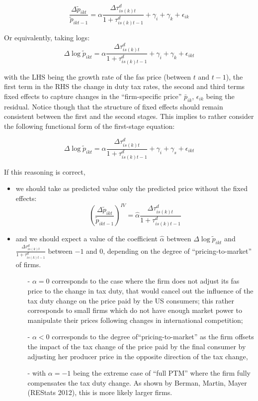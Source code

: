 \documentclass[a4paper,12pt]{article}
\begin{document}
$$\frac{\Delta \widetilde{p}_{ikt}}{\widetilde{p}_{ikt-1}} = \alpha \frac{\Delta \tau^d_{is(k)t}}{1+\tau_{is(k)t-1}^d} + \gamma_{i} +\gamma_{k}+\epsilon_{ik}$$

Or equivalently, taking logs:
$$\Delta \log \widetilde{p}_{ikt}= \alpha\frac{\Delta \tau^d_{is(k)t}}{1+\tau_{is(k)t-1}^d} +\gamma_{i} +\gamma_{k}+\epsilon_{ikt}$$


\noindent with the LHS being the growth rate of the fas price (between $t$ and $t-1$), the first term in the RHS the change in duty tax rates, the second and third terms fixed effects to capture changes in the ``firm-specific price'' $\bar{p}_{ik}$, $\epsilon_{ik}$ being the residual. Notice though that the structure of fixed effects should remain consistent between the first and the second stages. This implies to rather consider the following functional form of the first-stage equation:

\begin{equation}
\Delta \log \widetilde{p}_{ikt} = \alpha\frac{\Delta \tau^d_{is(k)t}}{1+\tau_{is(k)t-1}^d} +\gamma_{i} +\gamma_{s}+\epsilon_{ikt} \label{eq:firststage_Deltalog}
\end{equation}

If this reasoning is correct,
\begin{itemize}
\item we should take as predicted value only the predicted price without the fixed effects:
$$\left(\frac{\Delta \widetilde{p}_{ikt}}{\widetilde{p}_{ikt-1}}\right)^{IV} = \widehat{\alpha}\frac{\Delta \tau^d_{is(k)t}}{1+\tau_{is(k)t-1}^d} $$
\item and we should expect a value of the coefficient $\widehat{\alpha}$ between $\Delta \log \widetilde{p}_{ikt}$ and $\frac{\Delta \tau^d_{is(k)t}}{1+\tau_{is(k)t-1}^d} $ between $-1$ and $0$, depending on the degree of ``pricing-to-market'' of firms.
    \begin{itemize}
    \item[-] $\alpha = 0$ corresponds to the case where the firm does not adjust its fas price to the change in tax duty, that would cancel out the influence of the tax duty change on the price paid by the US consumers; this rather corresponds to small firms which do not have enough market power to manipulate their prices following changes in international competition;
    \item[-] $\alpha <0$ corresponds to the degree of``pricing-to-market'' as the firm offsets the impact of the tax change of the price paid by the final consumer by adjusting her producer price in the opposite direction of the tax change,
    \item[-] with $\alpha = -1$ being the extreme case of ``full PTM'' where the firm fully compensates the tax duty change. As shown by Berman, Martin, Mayer (REStats 2012), this is more likely larger firms.
    \end{itemize}
\end{itemize}
\end{document}
